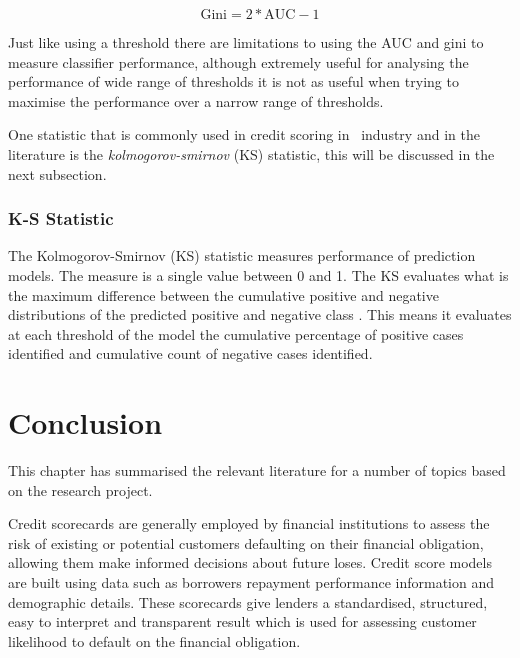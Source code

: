\begin{equation} \label{eq:gini}
\text{Gini} = 2*\text{AUC} - 1
\end{equation}

Just like using a threshold there are limitations to using the AUC and gini to measure classifier performance, although extremely useful for analysing the performance of wide range of thresholds it is not as useful when trying to maximise the performance over a narrow range of thresholds. 

One statistic that is commonly used in credit scoring in \subjectname\, industry and in the literature is the \textit{kolmogorov-smirnov} (KS) statistic, this will be discussed in the next subsection.
	

\subsubsection{K-S Statistic}\label{subsub:ks}
The Kolmogorov-Smirnov (KS) statistic measures performance of prediction models. The measure is a single value between 0 and 1. The KS evaluates what is the maximum difference between the cumulative positive and negative distributions of the predicted positive and negative class \citep{seliya_study_2009}. This means it evaluates at each threshold of the model the cumulative percentage of positive cases identified and cumulative count of negative cases identified.


\section{Conclusion}\label{sotaConc}
This chapter has summarised the relevant literature for a number of topics based on the research project.

Credit scorecards are generally employed by financial institutions to assess the risk of existing or potential customers defaulting on their financial obligation, allowing them make informed decisions about future loses. Credit score models are built using data such as borrowers repayment performance information and demographic details. These scorecards give lenders a standardised, structured, easy to interpret and transparent result which is used for assessing customer likelihood to default on the financial obligation. 

